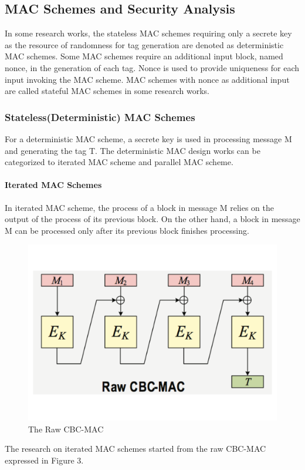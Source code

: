 \documentclass{article}
\begin{document}
\subsection{MAC Schemes and Security Analysis}
In some research works, the stateless MAC schemes requiring only a secrete key
as the resource of randomness for tag generation are denoted as deterministic MAC schemes.
Some MAC schemes require an additional input block, named nonce, in the
generation of each tag. Nonce is used to provide uniqueness for each input invoking the MAC scheme. MAC schemes with nonce as additional input are called stateful MAC schemes in some research works.
\subsubsection{Stateless(Deterministic) MAC Schemes}
For a deterministic MAC scheme, a secrete key is used in processing message M and generating the tag T. The deterministic MAC design works can be categorized to iterated MAC scheme and parallel MAC scheme.
\paragraph{Iterated MAC Schemes}
In iterated MAC scheme, the process of a block in message M relies on the output of the process of its previous block. On the other hand, a block in message M can be processed only after its previous block finishes processing. 
\begin{figure}[htbp]
\centering
\includegraphics[scale=0.3]{./diagrams/cbc-mac.pdf}
\caption{The Raw CBC-MAC}
\label{CBC-mac }
\end{figure}
The research on iterated MAC schemes started from the raw CBC-MAC expressed in Figure 3.
\end{document}
